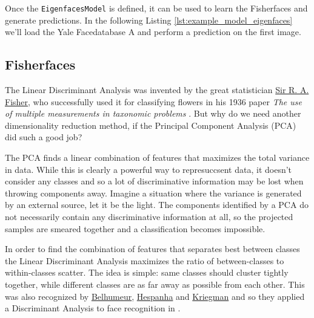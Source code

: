 	
	
		Once the \lstinline|EigenfacesModel| is defined, it can be used to learn the Fisherfaces and generate predictions. In the following Listing \ref{lst:example_model_eigenfaces} we'll load the Yale Facedatabase A and perform a prediction on the first image.
		
	

\fi

\subsection{Fisherfaces}

\label{ssection:fisherfaces}

The Linear Discriminant Analysis was invented by the great statistician \href{http://en.wikipedia.org/wiki/Ronald_Fisher}{Sir R. A. Fisher}, who successfully used it for classifying flowers in his 1936 paper \textit{The use of multiple measurements in taxonomic problems} \cite{Fisher36}. But why do we need another dimensionality reduction method, if the Principal Component Analysis (PCA) did such a good job? 

The PCA finds a linear combination of features that maximizes the total variance in data. While this is clearly a powerful way to represuccsent data, it doesn't consider any classes and so a lot of discriminative information may be lost when throwing components away. Imagine a situation where the variance is generated by an external source, let it be the light. The components identified by a PCA do not necessarily contain any discriminative information at all, so the projected samples are smeared together and a classification becomes impossible.

In order to find the combination of features that separates best between classes the Linear Discriminant Analysis maximizes the ratio of between-classes to within-classes scatter. The idea is simple: same classes should cluster tightly together, while different classes are as far away as possible from each other. This was also recognized by \href{http://www.cs.columbia.edu/~belhumeur/}{Belhumeur}, \href{http://www.ece.ucsb.edu/~hespanha/}{Hespanha} and \href{http://cseweb.ucsd.edu/~kriegman/}{Kriegman} and so they applied a Discriminant Analysis to face recognition in \cite{belhumeru97}. 


